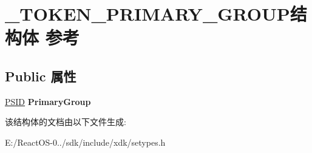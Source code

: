 \hypertarget{struct___t_o_k_e_n___p_r_i_m_a_r_y___g_r_o_u_p}{}\section{\+\_\+\+T\+O\+K\+E\+N\+\_\+\+P\+R\+I\+M\+A\+R\+Y\+\_\+\+G\+R\+O\+U\+P结构体 参考}
\label{struct___t_o_k_e_n___p_r_i_m_a_r_y___g_r_o_u_p}
\subsection*{Public 属性}
\begin{DoxyCompactItemize}
\item 
\mbox{\label{struct___t_o_k_e_n___p_r_i_m_a_r_y___g_r_o_u_p_ab67e2e52adaf5dbca3957c724d2de2f4}} 
\hyperlink{struct___s_i_d}{P\+S\+ID} {\bfseries Primary\+Group}
\end{DoxyCompactItemize}


该结构体的文档由以下文件生成\+:\begin{DoxyCompactItemize}
\item 
E\+:/\+React\+O\+S-\/0../sdk/include/xdk/setypes.\+h\end{DoxyCompactItemize}
